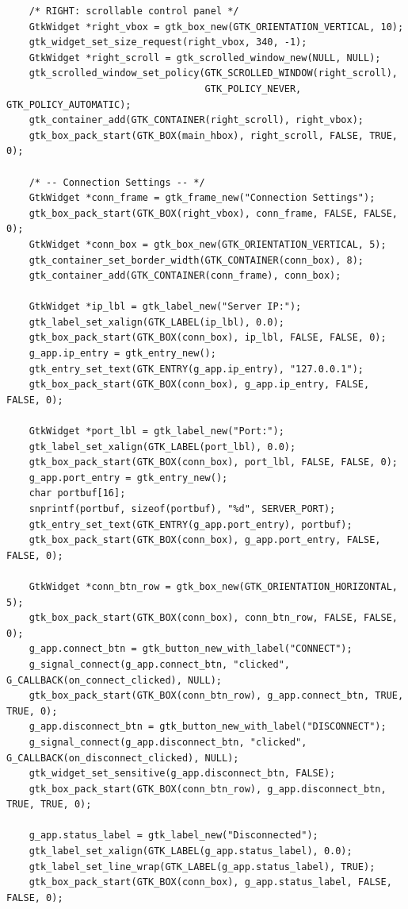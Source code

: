 \begin{verbatim}
    /* RIGHT: scrollable control panel */
    GtkWidget *right_vbox = gtk_box_new(GTK_ORIENTATION_VERTICAL, 10);
    gtk_widget_set_size_request(right_vbox, 340, -1);
    GtkWidget *right_scroll = gtk_scrolled_window_new(NULL, NULL);
    gtk_scrolled_window_set_policy(GTK_SCROLLED_WINDOW(right_scroll),
                                   GTK_POLICY_NEVER, GTK_POLICY_AUTOMATIC);
    gtk_container_add(GTK_CONTAINER(right_scroll), right_vbox);
    gtk_box_pack_start(GTK_BOX(main_hbox), right_scroll, FALSE, TRUE, 0);

    /* -- Connection Settings -- */
    GtkWidget *conn_frame = gtk_frame_new("Connection Settings");
    gtk_box_pack_start(GTK_BOX(right_vbox), conn_frame, FALSE, FALSE, 0);
    GtkWidget *conn_box = gtk_box_new(GTK_ORIENTATION_VERTICAL, 5);
    gtk_container_set_border_width(GTK_CONTAINER(conn_box), 8);
    gtk_container_add(GTK_CONTAINER(conn_frame), conn_box);

    GtkWidget *ip_lbl = gtk_label_new("Server IP:");
    gtk_label_set_xalign(GTK_LABEL(ip_lbl), 0.0);
    gtk_box_pack_start(GTK_BOX(conn_box), ip_lbl, FALSE, FALSE, 0);
    g_app.ip_entry = gtk_entry_new();
    gtk_entry_set_text(GTK_ENTRY(g_app.ip_entry), "127.0.0.1");
    gtk_box_pack_start(GTK_BOX(conn_box), g_app.ip_entry, FALSE, FALSE, 0);

    GtkWidget *port_lbl = gtk_label_new("Port:");
    gtk_label_set_xalign(GTK_LABEL(port_lbl), 0.0);
    gtk_box_pack_start(GTK_BOX(conn_box), port_lbl, FALSE, FALSE, 0);
    g_app.port_entry = gtk_entry_new();
    char portbuf[16];
    snprintf(portbuf, sizeof(portbuf), "%d", SERVER_PORT);
    gtk_entry_set_text(GTK_ENTRY(g_app.port_entry), portbuf);
    gtk_box_pack_start(GTK_BOX(conn_box), g_app.port_entry, FALSE, FALSE, 0);

    GtkWidget *conn_btn_row = gtk_box_new(GTK_ORIENTATION_HORIZONTAL, 5);
    gtk_box_pack_start(GTK_BOX(conn_box), conn_btn_row, FALSE, FALSE, 0);
    g_app.connect_btn = gtk_button_new_with_label("CONNECT");
    g_signal_connect(g_app.connect_btn, "clicked", G_CALLBACK(on_connect_clicked), NULL);
    gtk_box_pack_start(GTK_BOX(conn_btn_row), g_app.connect_btn, TRUE, TRUE, 0);
    g_app.disconnect_btn = gtk_button_new_with_label("DISCONNECT");
    g_signal_connect(g_app.disconnect_btn, "clicked", G_CALLBACK(on_disconnect_clicked), NULL);
    gtk_widget_set_sensitive(g_app.disconnect_btn, FALSE);
    gtk_box_pack_start(GTK_BOX(conn_btn_row), g_app.disconnect_btn, TRUE, TRUE, 0);

    g_app.status_label = gtk_label_new("Disconnected");
    gtk_label_set_xalign(GTK_LABEL(g_app.status_label), 0.0);
    gtk_label_set_line_wrap(GTK_LABEL(g_app.status_label), TRUE);
    gtk_box_pack_start(GTK_BOX(conn_box), g_app.status_label, FALSE, FALSE, 0);


\end{verbatim}
